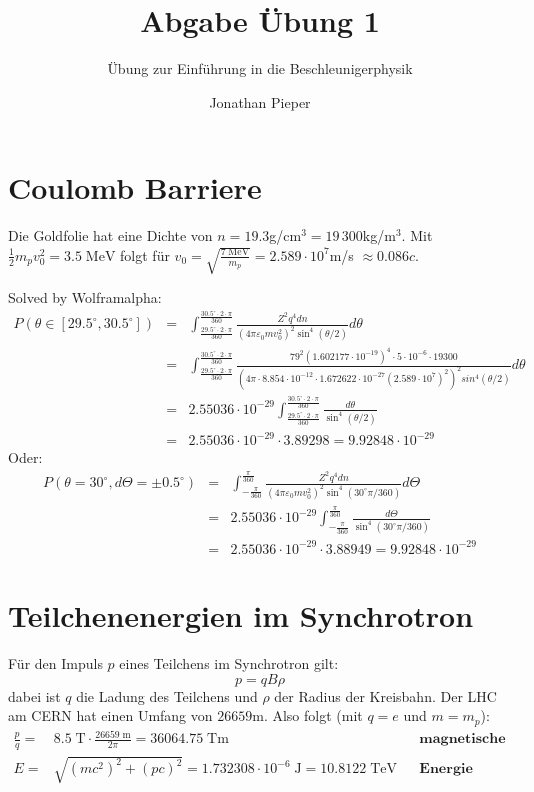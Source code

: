 \documentclass[12pt,DIV=15,a4paper,twoside,draft=false]{scrartcl}
\author{Jonathan Pieper}
\title{Abgabe Übung 1}
\subtitle{Übung zur Einführung in die Beschleunigerphysik}
\begin{document}
\maketitle
{}

\section{Coulomb Barriere}
Die Goldfolie hat eine Dichte von $n=19.3$\;g/cm$^{3} = 19\,{}300$\;kg/m$^3$. Mit $\frac{1}{2} m_p v_0^2 = 3.5\;\mathrm{MeV}$ folgt für $v_0 = \sqrt{\frac{7\;\mathrm{MeV}}{m_p}} = 2.589\cdot 10^7$\;m/s ${}\approx 0.086 c$.

Solved by Wolframalpha:
\begin{eqnarray*}
P(θ∈[29.5^\circ , 30.5^{\circ}]) &=&
 ∫_{\frac{29.5^\circ \cdot 2 \cdot \pi}{360}}^{\frac{30.5^{\circ} \cdot 2 \cdot \pi}{360}}
\frac{Z^2 q^4 d n}{(4 \pi ε_0 m v_0^2)^2 \sin^4(θ/2)} dθ\\
&=& ∫_{\frac{29.5^\circ \cdot 2 \cdot \pi}{360}}^{\frac{30.5^{\circ} \cdot 2 \cdot \pi}{360}}
 \frac{79^2 (1.602177\cdot 10^{-19})^4 \cdot 5\cdot 10^{-6} \cdot  19300}{(4 \pi \cdot 8.854 \cdot 10^{-12}\cdot  1.672622\cdot 10^{-27} (2.589\cdot 10^7)^2)^2 sin^4(θ/2)} dθ\\ %
&=& 2.55036\cdot 10^{-29} ∫_{\frac{29.5^\circ \cdot 2 \cdot \pi}{360}}^{\frac{30.5^{\circ} \cdot 2 \cdot \pi}{360}}
\frac{dθ}{\sin^4(θ/2)}\\
& = & 2.55036 \cdot 10^{-29} \cdot 3.89298 = 9.92848 \cdot 10^{-29}
\end{eqnarray*}
Oder:
\begin{eqnarray*}
P(θ=30^{\circ}, dΘ=±0.5^{\circ}) &=&
 ∫_{-\frac{\pi}{360}}^{\frac{\pi}{360}}
\frac{Z^2 q^4 d n}{(4 \pi ε_0 m v_0^2)^2 \sin^4(30^\circ \pi /360)} dΘ\\
&=& 2.55036\cdot 10^{-29} ∫_{-\frac{\pi}{360}}^{\frac{\pi}{360}}
\frac{dΘ}{\sin^4(30^\circ \pi /360)}\\
& = & 2.55036 \cdot 10^{-29}\cdot 3.88949 = 9.92848 \cdot 10^{-29}
\end{eqnarray*}


\section{Teilchenenergien im Synchrotron}
Für den Impuls $p$ eines Teilchens im Synchrotron gilt:
$$ p = q B ρ $$
dabei ist $q$ die Ladung des Teilchens und $ρ$ der Radius der Kreisbahn. Der LHC am CERN hat einen Umfang von ${26659}$\;m. Also folgt (mit $q=e$ und $m=m_p$):
\begin{align*}
\frac{p}{q} =& 8.5\;\mathrm{T} \cdot \frac{26659\;\mathrm{m}}{2π} = 36064.75\;\mathrm{Tm} &&\textbf{magnetische Steifigkeit}\\
E =& \sqrt{(m c^2)^2 + (pc)^2} = 1.732308 \cdot 10^{-6}\;\mathrm{J} = 
10.8122\;\mathrm{TeV} && \textbf{Energie}
\end{align*}
\end{document}
